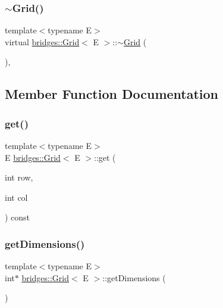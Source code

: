\mbox{\label{classbridges_1_1_grid_a46cc94397ea38211349b10e3629b2590}} 
\subsubsection{\texorpdfstring{$\sim$\+Grid()}{~Grid()}}
{\footnotesize\ttfamily template$<$typename E$>$ \\
virtual \mbox{\hyperlink{classbridges_1_1_grid}{bridges\+::\+Grid}}$<$ E $>$\+::$\sim$\mbox{\hyperlink{classbridges_1_1_grid}{Grid}} (\begin{DoxyParamCaption}{ }\end{DoxyParamCaption})\hspace{0.3cm}{\ttfamily [inline]}, {\ttfamily [virtual]}}



\subsection{Member Function Documentation}
\mbox{\label{classbridges_1_1_grid_a0f8ef03d9b64732f69a9dc8c240df5da}} 
\subsubsection{\texorpdfstring{get()}{get()}}
{\footnotesize\ttfamily template$<$typename E$>$ \\
E \mbox{\hyperlink{classbridges_1_1_grid}{bridges\+::\+Grid}}$<$ E $>$\+::get (\begin{DoxyParamCaption}\item[{int}]{row,  }\item[{int}]{col }\end{DoxyParamCaption}) const\hspace{0.3cm}{\ttfamily [inline]}}

\mbox{\label{classbridges_1_1_grid_ad21e4fc94483ef822fda9b74a52b9f48}} 
\subsubsection{\texorpdfstring{get\+Dimensions()}{getDimensions()}}
{\footnotesize\ttfamily template$<$typename E$>$ \\
int$\ast$ \mbox{\hyperlink{classbridges_1_1_grid}{bridges\+::\+Grid}}$<$ E $>$\+::get\+Dimensions (\begin{DoxyParamCaption}{ }\end{DoxyParamCaption})\hspace{0.3cm}{\ttfamily [inline]}}

